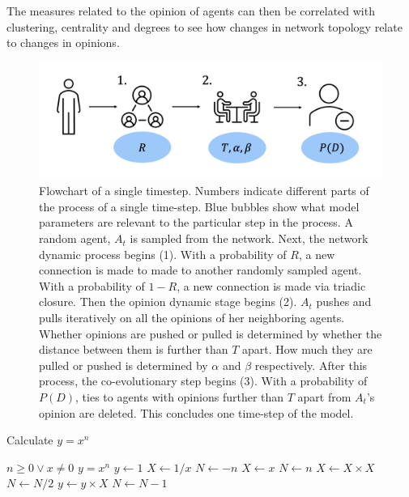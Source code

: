 \documentclass{article}
\begin{document}
The measures related to the opinion of agents can then be correlated with clustering, centrality and degrees to see how changes in network topology relate to changes in opinions. 

\begin{figure}[H]
    \centering
    \includegraphics[width=.8\linewidth]{../plots/schematics/model_representation.png}
  \caption{Flowchart of a single timestep. Numbers indicate different parts of the process of a single time-step. Blue bubbles show what model parameters are relevant to the particular step in the process. A random agent, $A_t$ is sampled from the network. Next, the network dynamic process begins (1). With a probability of $R$, a new connection is made to made to another randomly sampled agent. With a probability of $1-R$, a new connection is made via triadic closure. Then the opinion dynamic stage begins (2). $A_t$ pushes and pulls iteratively on all the opinions of her neighboring agents. Whether opinions are pushed or pulled is determined by whether the distance between them is further than $T$ apart. How much they are pulled or pushed is determined by $\alpha$ and $\beta$ respectively. After this process, the co-evolutionary step begins (3). With a probability of $P(D)$, ties to agents with opinions further than $T$ apart from $A_t$'s opinion are deleted. This concludes one time-step of the model.}
  \label{fig:flowchart}
\end{figure}

\begin{algorithm}
    \caption{Calculate $y = x^n$}
    \begin{algorithmic} 
    \REQUIRE $n \geq 0 \vee x \neq 0$
    \ENSURE $y = x^n$
    \STATE $y \leftarrow 1$
    \STATE $X \leftarrow 1 / x$
    \STATE $N \leftarrow -n$
    \ELSE
    \STATE $X \leftarrow x$
    \STATE $N \leftarrow n$
    \ENDIF
    \STATE $X \leftarrow X \times X$
    \STATE $N \leftarrow N / 2$
    \ELSE[$N$ is odd]
    \STATE $y \leftarrow y \times X$
    \STATE $N \leftarrow N - 1$
    \ENDIF
    \ENDWHILE
    \end{algorithmic}
    \end{algorithm}
\end{document}
